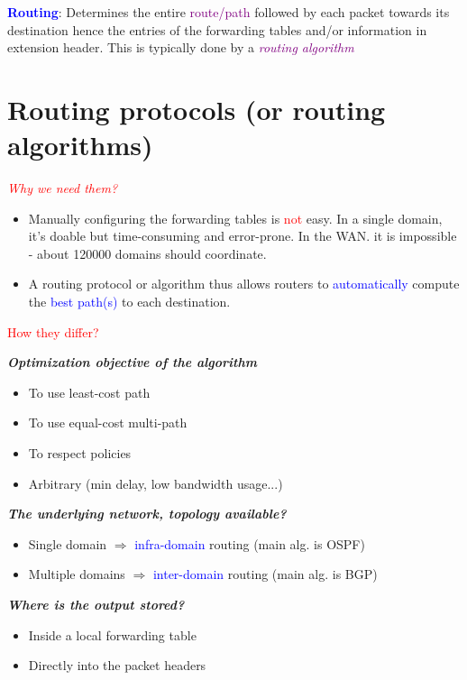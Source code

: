 \documentclass[11pt]{article}
\begin{document}
\textcolor{blue}{\textbf{Routing}}: Determines the entire \textcolor{purple}{route/path} followed by each packet towards its destination hence the entries of the forwarding tables and/or information in extension header. This is typically done by a \textit{\textcolor{purple}{routing algorithm}}

\section*{Routing protocols (or routing algorithms)}

\textcolor{red}{\textit{Why we need them?}}
\begin{itemize}
	\item Manually configuring the forwarding tables is \textcolor{red}{not} easy. In a single domain, it's doable but time-consuming and error-prone. In the WAN. it is impossible - about 120000 domains should coordinate. 
	\item A routing protocol or algorithm thus allows routers to \textcolor{blue}{automatically} compute the \textcolor{blue}{best path(s)} to each destination.
\end{itemize}

\textcolor{red}{How they differ?}

\textbf{\textit{Optimization objective of the algorithm}}
\begin{itemize}
	\item To use least-cost path
	\item To use equal-cost multi-path
	\item To respect policies
	\item Arbitrary (min delay, low bandwidth usage...)
\end{itemize}

\textbf{\textit{The underlying network, topology available?}}
\begin{itemize}
	\item Single domain $\Rightarrow$ \textcolor{blue}{infra-domain} routing (main alg. is OSPF)
	\item Multiple domains $\Rightarrow$ \textcolor{blue}{inter-domain} routing (main alg. is BGP)
\end{itemize}

\textbf{\textit{Where is the output stored?}}
\begin{itemize}
	\item Inside a local forwarding table
	\item Directly into the packet headers
\end{itemize}
\end{document}
